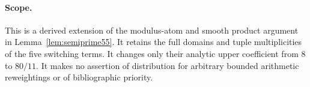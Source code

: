 \paragraph{Scope.}
This is a derived extension of the modulus-atom and smooth
product argument in Lemma~\ref{lem:semiprime55}.
It retains the full domains and tuple multiplicities of the
five switching terms. It changes only their analytic upper
coefficient from $8$ to $80/11$.
It makes no assertion of distribution for arbitrary bounded
arithmetic reweightings or of bibliographic priority.
